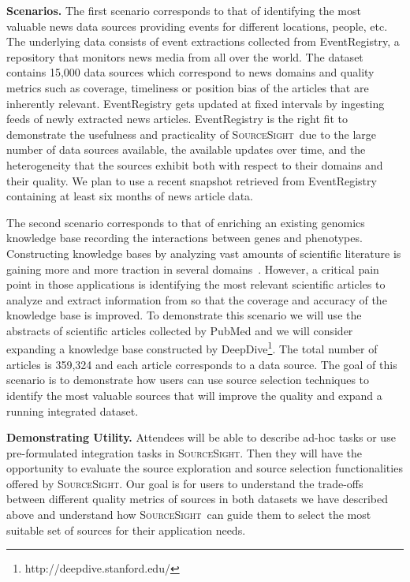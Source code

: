 \documentclass{sig-alternate-05-2015}
\newcommand\system{\textsc{SourceSight}}
\begin{document}
\vspace{2pt}\noindent\textbf{Scenarios.} The first scenario corresponds to that of identifying the most valuable news data sources providing events for different locations, people, etc. The underlying data consists of event extractions collected from EventRegistry, a repository that monitors news media from all over the world. The dataset contains 15,000 data sources which correspond to news domains and quality metrics such as coverage, timeliness or position bias of the articles that are inherently relevant. EventRegistry gets updated at fixed intervals by ingesting feeds of newly extracted news articles. EventRegistry is the right fit to demonstrate the usefulness and practicality of \system~due to the large number of data sources available, the available updates over time, and the heterogeneity that the sources exhibit both with respect to their domains and their quality. We plan to use a recent snapshot retrieved from EventRegistry containing at least six months of news article data. 

The second scenario corresponds to that of enriching an existing genomics knowledge base recording the interactions between genes and phenotypes. Constructing knowledge bases by analyzing vast amounts of scientific literature is gaining more and more traction in several domains~\cite{Niu_deepdive:web-scale}. However, a critical pain point in those applications is identifying the most relevant scientific articles to analyze and extract information from so that the coverage and accuracy of the knowledge base is improved. To demonstrate this scenario we will use the abstracts of scientific articles collected by PubMed and we will consider expanding a knowledge base constructed by DeepDive\footnote{http://deepdive.stanford.edu/}. The total number of articles is 359,324 and each article corresponds to a data source. The goal of this scenario is to demonstrate how users can use source selection techniques to identify the most valuable sources that will improve the quality and expand a running integrated dataset.


\vspace{2pt}\noindent\textbf{Demonstrating Utility.} Attendees will be able to describe ad-hoc tasks or use pre-formulated integration tasks in \system. Then they will have the opportunity to evaluate the source exploration and source selection functionalities offered by \system. Our goal is for users to understand the trade-offs between different quality metrics of sources in both datasets we have described above and understand how \system~can guide them to select the most suitable set of sources for their application needs.
\end{document}
